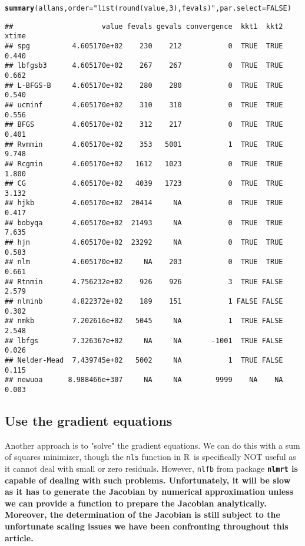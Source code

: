 \documentclass[11pt]{article}\usepackage[]{graphicx}\usepackage[]{color}
\makeatletter
\newcommand{\hlnum}[1]{\textcolor[rgb]{0.686,0.059,0.569}{#1}}%
\newcommand{\hlstr}[1]{\textcolor[rgb]{0.192,0.494,0.8}{#1}}%
\newcommand{\hlstd}[1]{\textcolor[rgb]{0.345,0.345,0.345}{#1}}%
\newcommand{\hlkwc}[1]{\textcolor[rgb]{0.333,0.667,0.333}{#1}}%
\newcommand{\hlkwd}[1]{\textcolor[rgb]{0.737,0.353,0.396}{\textbf{#1}}}%
\newenvironment{kframe}{%
 \def\at@end@of@kframe{}%
 \ifinner\ifhmode%
  \def\at@end@of@kframe{\end{minipage}}%
  \begin{minipage}{\columnwidth}%
 \fi\fi%
 \def\FrameCommand##1{\hskip\@totalleftmargin \hskip-\fboxsep
 \colorbox{shadecolor}{##1}\hskip-\fboxsep
     \hskip-\linewidth \hskip-\@totalleftmargin \hskip\columnwidth}%
 \MakeFramed {\advance\hsize-\width
   \@totalleftmargin\z@ \linewidth\hsize
   \@setminipage}}%
 {\par\unskip\endMakeFramed%
 \at@end@of@kframe}
\newenvironment{knitrout}{}{} %
\newcommand{\R}{{\sf R}}
\newcommand{\code}[1]{{\tt#1}}
\newcommand{\pkg}[1]{\bf{\tt#1}\rm }
\makeatother
\begin{document}
\begin{knitrout}
\begin{kframe}
{\ttfamily\noindent\color{warningcolor}{\#\# Warning in optimr(par, fn, gr, method = meth, lower = lower, upper = upper, : Maximum number of fevals exceeded\ \ Restarts for stagnation =0}}\begin{alltt}
\hlkwd{summary}\hlstd{(allans,} \hlkwc{order} \hlstd{=} \hlstr{"list(round(value, 3), fevals)"}\hlstd{,} \hlkwc{par.select} \hlstd{=} \hlnum{FALSE}\hlstd{)}
\end{alltt}
\begin{verbatim}
##                     value fevals gevals convergence  kkt1  kkt2 xtime
## spg          4.605170e+02    230    212           0  TRUE  TRUE 0.440
## lbfgsb3      4.605170e+02    267    267           0  TRUE  TRUE 0.662
## L-BFGS-B     4.605170e+02    280    280           0  TRUE  TRUE 0.540
## ucminf       4.605170e+02    310    310           0  TRUE  TRUE 0.556
## BFGS         4.605170e+02    312    217           0  TRUE  TRUE 0.401
## Rvmmin       4.605170e+02    353   5001           1  TRUE  TRUE 9.748
## Rcgmin       4.605170e+02   1612   1023           0  TRUE  TRUE 1.800
## CG           4.605170e+02   4039   1723           0  TRUE  TRUE 3.132
## hjkb         4.605170e+02  20414     NA           0  TRUE  TRUE 0.417
## bobyqa       4.605170e+02  21493     NA           0  TRUE  TRUE 7.635
## hjn          4.605170e+02  23292     NA           0  TRUE  TRUE 0.583
## nlm          4.605170e+02     NA    203           0  TRUE  TRUE 0.661
## Rtnmin       4.756232e+02    926    926           3  TRUE FALSE 2.579
## nlminb       4.822372e+02    189    151           1 FALSE FALSE 0.302
## nmkb         7.202616e+02   5045     NA           1  TRUE FALSE 2.548
## lbfgs        7.326367e+02     NA     NA       -1001  TRUE FALSE 0.026
## Nelder-Mead  7.439745e+02   5002     NA           1  TRUE FALSE 0.115
## newuoa      8.988466e+307     NA     NA        9999    NA    NA 0.003
\end{verbatim}
\end{kframe}
\end{knitrout}



\subsection{Use the gradient equations}

Another approach is to "solve" the gradient equations. We can do this with 
a sum of squares minimizer, though the \code{nls} function in \R\ is 
specifically NOT useful as it cannot deal
with small or zero residuals. However, \code{nlfb} 
from package \pkg{nlmrt} is capable of dealing
with such problems. Unfortunately, it will be slow as it has to 
generate the Jacobian by numerical
approximation unless we can provide a function to prepare the 
Jacobian analytically. Moreover,
the determination of the Jacobian is still subject to 
the unfortunate scaling issues we have
been confronting throughout this article.
\end{document}
